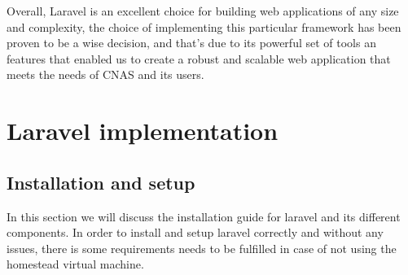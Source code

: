 \medskip Overall, Laravel is an excellent choice for building web applications of any size and complexity, the choice of implementing this particular framework has been proven to be a wise decision, and that's due to its powerful set of tools an features that enabled us to create a robust and scalable web application that meets the needs of CNAS and its users. 
\section{Laravel implementation}
\subsection{Installation and setup}
In this section we will discuss the installation guide for laravel and its different components. In order to install and setup laravel correctly and without any issues, there is some requirements needs to be fulfilled in case of not using the homestead virtual machine. 

